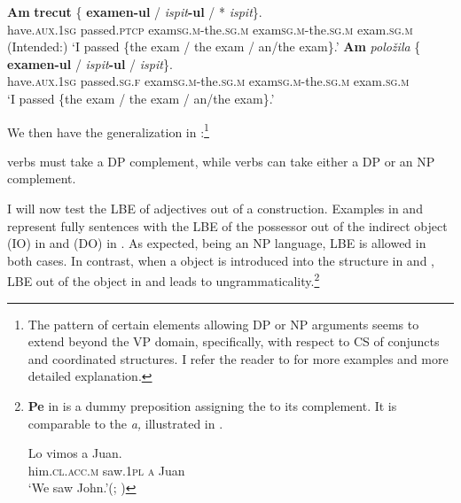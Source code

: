 \documentclass[output=paper,hidelinks,newtxmath,]{langscibook}
\begin{document}
\ea \label{15:ex20}
	\ea\label{15:ex20a}
    \gll \textbf{Am} \textbf{trecut} \{\hspace{-2pt} \textbf{examen-ul} / \textit{ispit}\textbf{-ul} /\hspace{0.1cm} *\hspace{-2pt} \textit{ispit}\hspace{1pt}\}.\\          
         have\textsc{.aux.1sg} passed\textsc{.ptcp} {} exam\textsc{sg.m}-the\textsc{.sg.m} {} exam\textsc{sg.m}-the\textsc{.sg.m} {} {} exam\textsc{.sg.m}\\
         \glt (Intended:) `I passed \{the exam / the exam / an/the exam\}.'
	\ex\label{15:ex20b}
    \gll \textbf{Am} \textit{položila} \{\hspace{-2pt} \textbf{examen-ul} / \textit{ispit}\textbf{-ul} / \textit{ispit}\hspace{1pt}\}.\\
         have\textsc{.aux.1sg} passed\textsc{.sg.f} {} exam\textsc{sg.m}-the\textsc{.sg.m} {} exam\textsc{sg.m}-the\textsc{.sg.m} {} exam\textsc{.sg.m}\\
         \glt `I passed \{the exam / the exam / an/the exam\}.'
	\z
\z

\noindent We then have the generalization in :\footnote{\label{15:fn10}The pattern of certain elements allowing DP or NP arguments seems to extend beyond the VP domain, specifically, with respect to CS of conjuncts and coordinated structures. I refer the reader to \citet{Petroj} for more examples and more detailed explanation.}

\ea\label{15:ex21}
   verbs must take a DP complement, while  verbs can take either a DP or an NP complement.
\z

\noindent I will now test the LBE of adjectives out of a  construction. Examples in  and  represent fully  sentences with the LBE of the possessor out of the indirect object (IO) in  and  (DO) in . As expected,  being an NP language, LBE is allowed in both cases. In contrast, when a  object is introduced into the structure in  and , LBE out of the  object in  and  leads to ungrammaticality.\footnote{\label{15:fn11}\textbf{Pe} in  is a dummy preposition assigning the  to its complement. It is comparable to the  \textit{a,} illustrated in .

\ea \gll Lo vimos a Juan.\label{15:fn11ex}\\
him\textsc{.cl.acc.m} saw\textsc{.1pl} \textsc{a} Juan\\
\glt `We saw John.'\hfill(; \citealt{Jaeggli1986})
\z }
\end{document}
